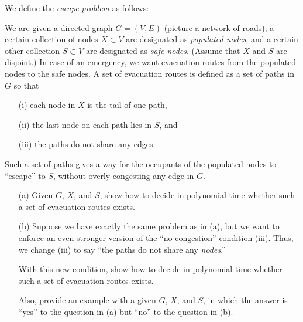 \documentclass[11pt]{article}
\theoremstyle{numberplain}
\theoremstyle{nonumberplain}
\newcommand{\0}{{\mathbf{0}}}
\begin{document}
\begin{ques}[HW5, 7-14]

We define the {\em escape problem} as
follows:

  We are given a directed graph $G = (V,E)$ (picture a
network of roads); a certain collection of nodes $X \subset V$
are designated as {\em populated nodes}, and a certain
other collection $S \subset V$ are designated as {\em safe nodes}.
(Assume that $X$ and $S$ are disjoint.)
In case of an emergency, we want evacuation routes
from the populated nodes to the safe nodes.
A set of evacuation routes is defined as a set
of paths in $G$ so that 
\begin{enumerate}
\item[(i)] each node in $X$ is the tail of one path, 
\item[(ii)] the last node on each path lies in $S$, and
\item[(iii)] the paths do not share any edges.
\end{enumerate} 
Such a set of paths gives a way for the
occupants of the populated nodes to ``escape'' to $S$,
without overly congesting any edge in $G$.

\begin{enumerate}
\item[(a)]  Given $G$, $X$, and $S$, show how to decide in
polynomial time whether such a set of evacuation routes exists.
\item[(b)]  Suppose we have exactly the same problem as in (a),
but we want to enforce an even stronger version of
the ``no congestion'' condition (iii).
Thus, we change (iii) to say
``the paths do not share any {\em nodes}.''

With this new condition, show how to decide in
polynomial time whether such a set of evacuation routes exists.

Also, provide an example with a given $G$, $X$, and $S$, in which
the answer is ``yes'' to the question in (a) but ``no''
to the question in (b).
\end{enumerate}
\end{ques}
\end{document}
